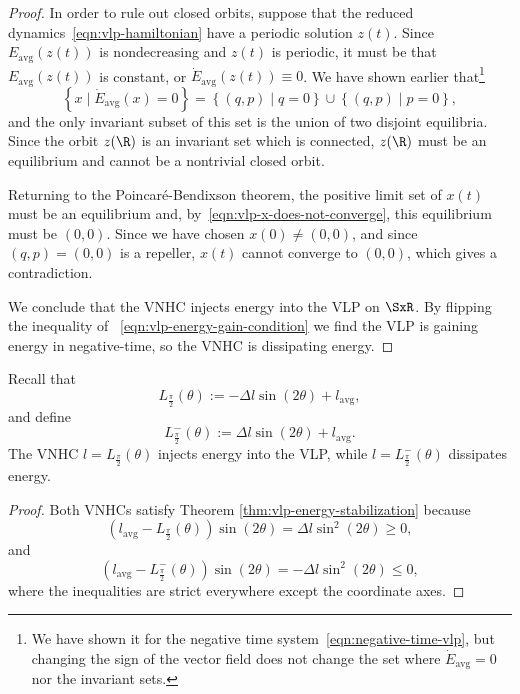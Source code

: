 \begin{proof}
In order to rule out closed orbits, suppose that the reduced
dynamics~\eqref{eqn:vlp-hamiltonian} have a periodic solution \( z(t)\). 
Since \( E_\text{avg}(z(t)) \) is nondecreasing and \(z(t)\)
is periodic, it must be that \( E_\text{avg}(z(t)) \) is constant, or
\(\dot E_\text{avg}(z(t)) \equiv 0\). 
We have shown earlier
that\footnote{We have shown it for the negative time
system~\eqref{eqn:negative-time-vlp}, but changing the sign of the
vector field does not change the set where 
\(\dot E_\text{avg} =0\) nor the invariant sets.}
\[
   \left\{x \mid \dot E_\text{avg}(x) = 0\right\} = \left\{(q,p) \mid q = 0\right\}
   \cup \left\{(q,p) \mid p =0\right\},
\]
and the only invariant subset of this set is the union of two disjoint
equilibria. 
Since the orbit \(z(\R)\) is an invariant set which is
connected, \(z(\R)\) must be an equilibrium and cannot be a nontrivial
closed orbit.

Returning to the Poincar\'e-Bendixson theorem, the positive limit set
of \( x(t)\) must be an equilibrium and,
by~\eqref{eqn:vlp-x-does-not-converge}, this equilibrium must be 
\( (0,0)\). 
Since we have chosen \(x(0) \neq (0,0)\), and since \( (q,p) = (0,0) \) is a
repeller, \( x(t) \) cannot converge to \( (0,0)\), which gives a contradiction.

We conclude that the VNHC injects energy into the VLP on 
\(\SxR\).
By flipping the inequality of ~\eqref{eqn:vlp-energy-gain-condition}
we find the VLP is gaining energy in negative-time, so the VNHC is
dissipating energy.
\end{proof}

\begin{cor}
   Recall that
   \[
      L_\frac{\pi}{2}(\theta) := -\Delta l \sin(2\theta) + l_\text{avg}
      ,
   \]
   and define 
   \[
      L^{-}_\frac{\pi}{2}(\theta) := \Delta l \sin(2\theta) + l_\text{avg}
      .
   \]
   The VNHC \(l = L_\frac{\pi}{2}(\theta)\) injects energy into the VLP,
   while \(l = L^{-}_\frac{\pi}{2}(\theta)\) dissipates energy.
\end{cor}
\begin{proof}
   Both VNHCs satisfy Theorem \ref{thm:vlp-energy-stabilization} because
   \[
      \left(l_\text{avg} - L_\frac{\pi}{2}(\theta)\right)\sin(2\theta) = 
      \Delta l \sin^2(2\theta) \geq 0
      ,
   \] 
   and
   \[
      \left(l_\text{avg} - L^{-}_\frac{\pi}{2}(\theta)\right)\sin(2\theta) = 
      - \Delta l \sin^2(2\theta) \leq 0
      ,
   \] 
   where the inequalities are strict everywhere except the coordinate axes.
\end{proof}

